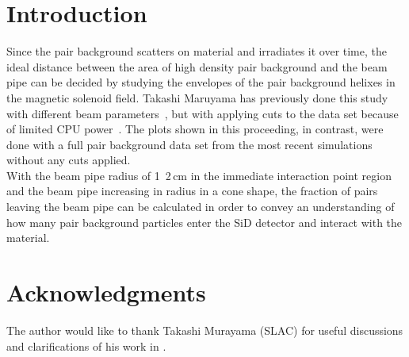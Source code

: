 \documentclass[12pt]{article}
\begin{document}
\section{Introduction}
\label{sec:introduction}
Since the pair background scatters on material and irradiates it over time, the ideal distance between the area of high density pair background and the beam pipe can be decided by studying the envelopes of the pair background helixes in the magnetic solenoid field.
Takashi Maruyama has previously done this study with different beam parameters~\cite{Takashi_plot}, but with applying cuts to the data set because of limited CPU power~\cite{Takashi}.
The plots shown in this proceeding, in contrast, were done with a full pair background data set from the most recent simulations without any cuts applied.\\
With the beam pipe radius of \unit{1.2}\,{cm} in the immediate interaction point region and the beam pipe increasing in radius in a cone shape, the fraction of pairs leaving the beam pipe can be calculated in order to convey an understanding of how many pair background particles enter the SiD detector and interact with the material. 





\section*{Acknowledgments}
The author would like to thank Takashi Murayama (SLAC) for useful discussions and clarifications of his work in \cite{Takashi_plot}.

%




\end{document}
